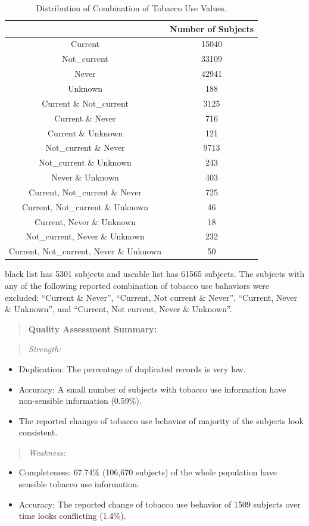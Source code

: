 \documentclass{article}
\begin{document}
\begin{table}[ht]
\centering
\begin{tabular}{cc}
  \hline
 & Number of Subjects \\ 
  \hline
Current & 15040 \\ 
  Not\_current & 33109 \\ 
  Never & 42941 \\ 
  Unknown & 188 \\ 
  Current \& Not\_current & 3125 \\ 
  Current \& Never & 716 \\ 
  Current \& Unknown & 121 \\ 
  Not\_current \& Never & 9713 \\ 
  Not\_current \& Unknown & 243 \\ 
  Never \& Unknown & 403 \\ 
  Current, Not\_current \& Never & 725 \\ 
  Current, Not\_current \& Unknown &  46 \\ 
  Current, Never \& Unknown &  18 \\ 
  Not\_current, Never \& Unknown & 232 \\ 
  Current, Not\_current, Never \& Unknown &  50 \\ 
   \hline
\end{tabular}
\caption{Distribution of Combination of Tobacco Use Values.} 
\label{Table:1}
\end{table}
black list has 5301 subjects and useable list has 61565 subjects.
The subjects with any of the following reported combination of tobacco use bahaviors were excluded: ``Current \& Never'', ``Current, Not current \& Never'', ``Current, Never \& Unknown'', and ``Current, Not current, Never \& Unknown''. 


\begin{quote}
\textbf{Quality Assessment Summary:}
\end{quote}
\begin{quote}
\emph{Strength:}
\end{quote}
\begin{itemize}
  \item Duplication: The percentage of duplicated records is very low.
  \item Accuracy: A small number of subjects with tobacco use information have non-sensible information (0.59\%). 
  \item The reported changes of tobacco use behavior of majority of the subjects look consistent. 
\end{itemize}
\begin{quote}
\emph{Weakness:}
\end{quote}
\begin{itemize}
  \item Completeness: 67.74\% (106,670 subjects) of the whole population have sensible tobacco use information.
  \item Accuracy: The reported change of tobacco use behavior of 1509 subjects over time looks conflicting (1.4\%). 
\end{itemize}
\end{document}
